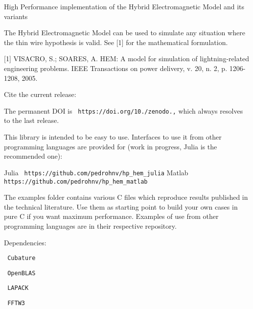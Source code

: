 High Performance implementation of the Hybrid Electromagnetic Model and its variants

The Hybrid Electromagnetic Model can be used to simulate any situation where the thin wire hypothesis is valid. See [1] for the mathematical formulation.

[1] V\+I\+S\+A\+C\+RO, S.; S\+O\+A\+R\+ES, A. H\+EM\+: A model for simulation of lightning-\/related engineering problems. I\+E\+EE Transactions on power delivery, v. 20, n. 2, p. 1206-\/1208, 2005.

Cite the current release\+: {\texttt{ }}

The permanent D\+OI is {\texttt{ https\+://doi.\+org/10./zenodo.,}} which always resolves to the last release.

This library is intended to be easy to use. Interfaces to use it from other programming languages are provided for (work in progress, Julia is the recommended one)\+:

Julia {\texttt{ https\+://github.\+com/pedrohnv/hp\+\_\+hem\+\_\+julia}} Matlab {\texttt{ https\+://github.\+com/pedrohnv/hp\+\_\+hem\+\_\+matlab}}

The {\ttfamily examples} folder contains various C files which reproduce results published in the technical literature. Use them as starting point to build your own cases in pure C if you want maximum performance. Examples of use from other programming languages are in their respective repository.

Dependencies\+:
\begin{DoxyItemize}
\item {\texttt{ Cubature}}
\item {\texttt{ Open\+B\+L\+AS}}
\item {\texttt{ L\+A\+P\+A\+CK}}
\item {\texttt{ F\+F\+T\+W3}} 
\end{DoxyItemize}
